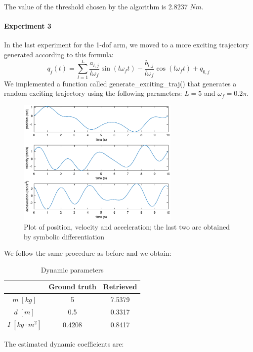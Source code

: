 \documentclass{article}
\begin{document}
The value of the threshold chosen by the algorithm is 2.8237 $Nm$.

\paragraph{Experiment 3} In the last experiment for the 1-dof arm, we moved to a more exciting trajectory generated according to this formula:
\[q_j(t) = \sum_{l=1}^{L}{\frac{ a_{l,j}}{ l\omega_f }\sin(l\omega_f t)-\frac{ b_{l,j}}{l\omega_f}\cos(l\omega_f t)+q_{0,j}}\]
We implemented a function called generate\_exciting\_traj() that generates a random exciting trajectory using the following parameters: $L = 5$ and $\omega_f = 0.2\pi$.

\begin{figure}[!htbp]
\centering
\includegraphics[width=0.7\textwidth]{images/1-dof/trajectory1.eps}
\caption{Plot of position, velocity and acceleration; the last two are obtained by symbolic differentiation}
\end{figure}
\FloatBarrier

We follow the same procedure as before and we obtain:

\begin{table}[!htbp]
\centering
\begin{tabular}{|c|cc|}
\hline
& Ground truth & Retrieved\\
\hline
$m\;[kg]$ & 5 & 7.5379\\ 
$d\;[m]$ & 0.5 & 0.3317\\
$I\;[kg\cdot m^2]$ & 0.4208 & 0.8417\\
\hline
\end{tabular}
\caption{Dynamic parameters}
\end{table}
\FloatBarrier

The estimated dynamic coefficients are:
\end{document}
